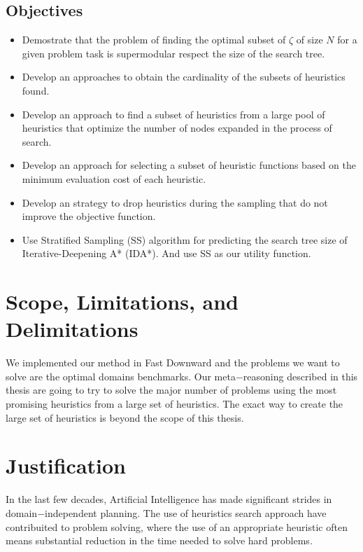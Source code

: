 \subsection{Objectives}
\noindent

\begin{itemize}
  \item Demostrate that the problem of finding the optimal subset of $\zeta$ of size $N$ for a given problem task is supermodular respect the size of the search tree.

  \item Develop an approaches to obtain the cardinality of the subsets of heuristics found.
  
  \item Develop an approach to find a subset of heuristics from a large pool of heuristics that optimize the number of nodes expanded in the process of search.
  
  \item Develop an approach for selecting a subset of heuristic functions based on the minimum evaluation cost of each heuristic.
  
  \item Develop an strategy to drop heuristics during the sampling that do not improve the objective function.  
  
  \item Use Stratified Sampling (SS) algorithm for predicting the search tree size of Iterative-Deepening A* (IDA*). And use SS as our utility function.
   
\end{itemize}
\section{Scope, Limitations, and Delimitations}
\noindent
We implemented our method in Fast Downward \cite{helmert2006fast} and the problems we want to solve are the optimal domains benchmarks.
Our meta$-$reasoning described in this thesis are going to try to solve the major number of problems using the most promising heuristics from a large set of heuristics.
The exact way to create the large set of heuristics is beyond the scope of this thesis.

\section{Justification}
\noindent
In the last few decades, Artificial Intelligence has made significant strides in domain$-$independent planning. The use of heuristics search approach have contribuited to problem solving, where the use of an appropriate heuristic often means substantial reduction in the time needed to solve hard problems.\\

